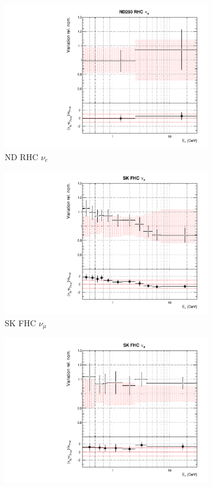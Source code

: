 \begin{figure}
\begin{subfigure}{0.24\textwidth}
  \includegraphics[width=0.95\linewidth]{figs/datflux7}
  \caption{ND RHC $\nu_e$}
  \label{fig:}
\end{subfigure}
\begin{subfigure}{0.24\textwidth}
  \centering
  \includegraphics[width=0.95\linewidth]{figs/datflux8}
  \caption{SK FHC $\nu_{\mu}$}
  \label{fig:}
\end{subfigure}
\begin{subfigure}{0.24\textwidth}
  \centering
  \includegraphics[width=0.95\linewidth]{figs/datflux9}

\end{subfigure}
\end{figure}
